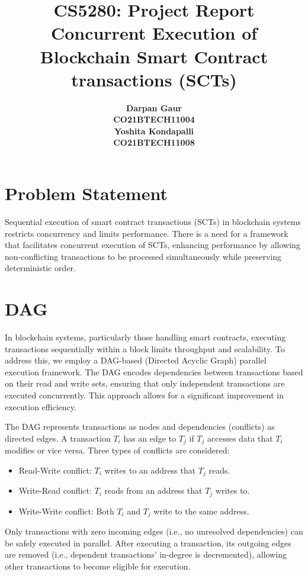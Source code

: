 \documentclass[12pt]{article}
\title{
    \textbf{CS5280: Project Report} \\
    \textbf{Concurrent Execution of Blockchain Smart Contract transactions (SCTs)} \\ 
}
\author{
    \begin{tabular}{c}
        \textbf{Darpan Gaur} \\
        \textbf{CO21BTECH11004}
    \end{tabular}
    \begin{tabular}{c}
        \textbf{Yoshita Kondapalli} \\
        \textbf{CO21BTECH11008}
    \end{tabular}
}
\date{}
\begin{document}
\maketitle

\hrulefill

\section{Problem Statement}
Sequential execution of smart contract transactions (SCTs) in blockchain systems restricts concurrency and limits performance.
There is a need for a framework that facilitates concurrent execution of SCTs, enhancing performance by allowing non-conflicting transactions to be processed simultaneously while preserving deterministic order. 

\section{DAG}

In blockchain systems, particularly those handling smart contracts, executing transactions sequentially within a block limits throughput and scalability. To address this, we employ a DAG-based (Directed Acyclic Graph) parallel execution framework. The DAG encodes dependencies between transactions based on their read and write sets, ensuring that only independent transactions are executed concurrently. This approach allows for a significant improvement in execution efficiency.

The DAG represents transactions as nodes and dependencies (conflicts) as directed edges. A transaction $T_i$ has an edge to $T_j$ if $T_j$ accesses data that $T_i$ modifies or vice versa. Three types of conflicts are considered:
\begin{itemize}
    \item Read-Write conflict: $T_i$ writes to an address that $T_j$ reads.
    \item Write-Read conflict: $T_i$ reads from an address that $T_j$ writes to.
    \item Write-Write conflict: Both $T_i$ and $T_j$ write to the same address.
\end{itemize}

Only transactions with zero incoming edges (i.e., no unresolved dependencies) can be safely executed in parallel. After executing a transaction, its outgoing edges are removed (i.e., dependent transactions' in-degree is decremented), allowing other transactions to become eligible for execution.
\end{document}
